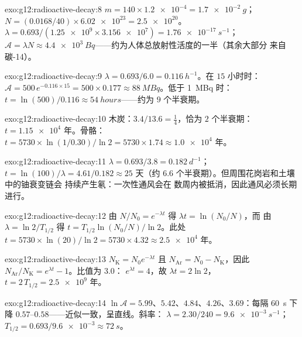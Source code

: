 \begin{solution}{exo:g12:radioactive-decay:8}
$m = 140 \times \num{1.2e-4} = \qty{1.7e-2}{g}$；
$N = (0.0168/40) \times \num{6.02e23} = \num{2.5e20}$。
$\lambda = 0.693/(\num{1.25e9} \times \num{3.156e7}) =
\qty{1.76e-17}{s^{-1}}$；$\mathcal A = \lambda N \approx
\qty{4.4e3}{Bq}$——约为人体总放射性活度的一半（其余大部分
来自碳-14）。
\end{solution}

\begin{solution}{exo:g12:radioactive-decay:9}
$\lambda = 0.693/6.0 = \qty{0.116}{h^{-1}}$。在 $15$ 小时时：
$\mathcal A = 500\,e^{-0.116 \times 15} = 500 \times 0.177 \approx
\qty{88}{MBq}$。低于 \qty{1}{MBq} 时：
$t = \ln(500)/0.116 \approx \qty{54}{hours}$——约为 $9$
个半衰期。
\end{solution}

\begin{solution}{exo:g12:radioactive-decay:10}
木炭：$3.4/13.6 = \tfrac14$，恰为 $2$ 个半衰期：
$t = \num{1.15e4}$ 年。骨骼：
$t = \num{5730} \times \ln(1/0.30)/\ln 2 = \num{5730} \times 1.74
\approx \num{1.0e4}$ 年。
\end{solution}

\begin{solution}{exo:g12:radioactive-decay:11}
$\lambda = 0.693/3.8 = \qty{0.182}{d^{-1}}$；
$t = \ln(100)/\lambda = 4.61/0.182 \approx 25$ 天（约 $6.6$
个半衰期）。但周围花岗岩和土壤中的铀衰变链会
持续产生氡：一次性通风会在
数周内被抵消，因此通风必须长期进行。
\end{solution}

\begin{solution}{exo:g12:radioactive-decay:12}
由 $N/N_0 = e^{-\lambda t}$ 得 $\lambda t = \ln(N_0/N)$，而
由 $\lambda = \ln 2/T_{1/2}$ 得 $t = T_{1/2}\ln(N_0/N)/\ln 2$。此处
$t = \num{5730} \times \ln(20)/\ln 2 = \num{5730} \times 4.32
\approx \num{2.5e4}$ 年。
\end{solution}

\begin{solution}{exo:g12:radioactive-decay:13}
$N_{\mathrm K} = N_0 e^{-\lambda t}$ 且
$N_{\mathrm{Ar}} = N_0 - N_{\mathrm K}$，因此
$N_{\mathrm{Ar}}/N_{\mathrm K} = e^{\lambda t} - 1$。比值为 $3.0$：
$e^{\lambda t} = 4$，故 $\lambda t = 2\ln 2$，
$t = 2\,T_{1/2} = \num{2.5e9}$ 年。
\end{solution}

\begin{solution}{exo:g12:radioactive-decay:14}
$\ln \mathcal A = 5.99$、$5.42$、$4.84$、$4.26$、$3.69$：每隔
\qty{60}{s} 下降 $0.57$--$0.58$——近似一致，呈直线。斜率：
$\lambda = 2.30/240 = \qty{9.6e-3}{s^{-1}}$；
$T_{1/2} = 0.693/\num{9.6e-3} \approx \qty{72}{s}$。
\end{solution}

